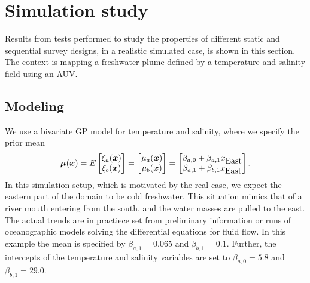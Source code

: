 \documentclass[aoas]{imsart}
\begin{document}
\section{Simulation study}\label{sec:simulations}

Results from tests performed to study the properties of different static and sequential survey designs, in a realistic simulated case, is shown in this section. The context is mapping a freshwater plume defined by a temperature and salinity field using an AUV. 

\subsection{Modeling}

We use a bivariate GP model for temperature and salinity, where we specify the prior mean 
\begin{equation}\label{m}
    \bmu(\bx)=E 
    \begin{bmatrix}
    \xi_a(\bx) \\
    \xi_b(\bx) 
    \end{bmatrix}=\begin{bmatrix} \mu_{a}(\bx)\\
\mu_{b}(\bx)
\end{bmatrix} 
= \begin{bmatrix} \beta_{a,0} + \beta_{a,1} x_{\mbox{East}} \\
\beta_{a,1} + \beta_{b,1} x_{\mbox{East}}
\end{bmatrix}.
\end{equation}
In this simulation setup, which is motivated by the real case, we expect the eastern part of the domain to be cold freshwater. This situation mimics that of a river mouth entering from the south, and the water masses are pulled to the east. The actual trends are in practiece set from preliminary information or runs of oceanographic models solving the differential equations for fluid flow. In this example the mean is specified by $\beta_{a,1}=0.065$ and $\beta_{b,1}=0.1$. Further, the intercepts of the temperature and salinity variables are set to $\beta_{a,0}=5.8$ and $\beta_{b,1}=29.0$. 

\end{document}
